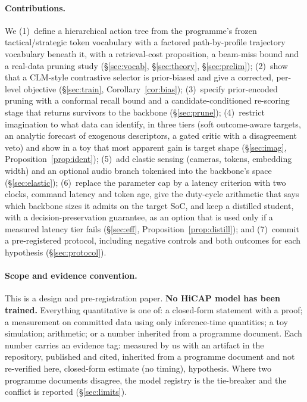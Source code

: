 \paragraph{Contributions.} We (1)~define a hierarchical action tree from the programme's frozen tactical/strategic token vocabulary with a factored path-by-profile trajectory vocabulary beneath it, with a retrieval-cost proposition, a beam-miss bound and a real-data pruning study (\S\ref{sec:vocab}, \S\ref{sec:theory}, \S\ref{sec:prelim});
(2)~show that a CLM-style contrastive selector is prior-biased and give a corrected, per-level objective (\S\ref{sec:train}, Corollary~\ref{cor:bias});
(3)~specify prior-encoded pruning with a conformal recall bound and a candidate-conditioned re-scoring stage that returns survivors to the backbone (\S\ref{sec:prune});
(4)~restrict imagination to what data can identify, in three tiers (soft outcome-aware targets, an analytic forecast of exogenous descriptors, a gated critic with a disagreement veto) and show in a toy that most apparent gain is target shape (\S\ref{sec:imag}, Proposition~\ref{prop:ident});
(5)~add elastic sensing (cameras, tokens, embedding width) and an optional audio branch tokenised into the backbone's space (\S\ref{sec:elastic});
(6)~replace the parameter cap by a latency criterion with two clocks, command latency and token age, give the duty-cycle arithmetic that says which backbone sizes it admits on the target SoC, and keep a distilled student, with a decision-preservation guarantee, as an option that is used only if a measured latency tier fails (\S\ref{sec:eff}, Proposition~\ref{prop:distill});
and (7)~commit a pre-registered protocol, including negative controls and both outcomes for each hypothesis (\S\ref{sec:protocol}).

\paragraph{Scope and evidence convention.}
This is a design and pre-registration paper. \textbf{No HiCAP model has been trained.} Everything quantitative is one of: a closed-form
statement with a proof; a measurement on committed data using only inference-time quantities; a toy simulation; arithmetic; or a number
inherited from a programme document. Each number carries an evidence tag: \evM{} measured by us with an artifact in the repository,
\evP{} published and cited, \evI{} inherited from a programme document and not re-verified here, \evE{} closed-form estimate (no timing),
\evH{} hypothesis. Where two programme documents disagree, the model registry is the tie-breaker and the conflict is reported (\S\ref{sec:limits}).
